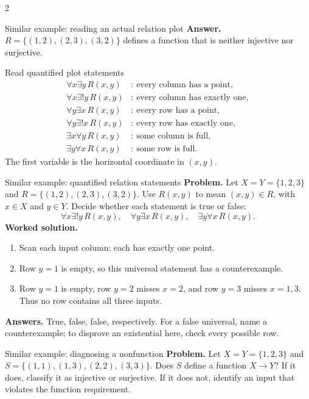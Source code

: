 \documentclass[10pt]{article}
\begin{document}
\begin{multicols}{2}
\begin{workedbox}{Similar example: reading an actual relation plot}
\textbf{Answer.} $R=\{(1,2),(2,3),(3,2)\}$ defines a function that is neither
injective nor surjective.
\end{workedbox}


\begin{methodbox}{Read quantified plot statements}
\begin{align*}
\forall x\exists y\,R(x,y)&:\ \text{every column has a point},\\
\forall x\exists!y\,R(x,y)&:\ \text{every column has exactly one},\\
\forall y\exists x\,R(x,y)&:\ \text{every row has a point},\\
\forall y\exists!x\,R(x,y)&:\ \text{every row has exactly one},\\
\exists x\forall y\,R(x,y)&:\ \text{some column is full},\\
\exists y\forall x\,R(x,y)&:\ \text{some row is full}.
\end{align*}
The first variable is the horizontal coordinate in $(x,y)$.
\end{methodbox}

\begin{workedbox}{Similar example: quantified relation statements}
\textbf{Problem.} Let $X=Y=\{1,2,3\}$ and
$R=\{(1,2),(2,3),(3,2)\}$. Use $R(x,y)$ to mean $(x,y)\in R$, with
$x\in X$ and $y\in Y$. Decide whether each statement is true or false:
\[
\forall x\exists!y\,R(x,y),\quad
\forall y\exists x\,R(x,y),\quad
\exists y\forall x\,R(x,y).
\]
\textbf{Worked solution.}
\begin{enumerate}
\item Scan each input column: each has exactly one point.
\item Row $y=1$ is empty, so this universal statement has a counterexample.
\item Row $y=1$ is empty, row $y=2$ misses $x=2$, and row $y=3$ misses
$x=1,3$. Thus no row contains all three inputs.
\end{enumerate}
\textbf{Answers.} True, false, false, respectively. For a false universal,
name a counterexample; to disprove an existential here, check every possible row.
\end{workedbox}

\begin{workedbox}{Similar example: diagnosing a nonfunction}
\textbf{Problem.} Let $X=Y=\{1,2,3\}$ and
$S=\{(1,1),(1,3),(2,2),(3,3)\}$. Does $S$ define a function $X\to Y$?
If it does, classify it as injective or surjective. If it does not, identify
an input that violates the function requirement.


\end{workedbox}
\end{multicols}
\end{document}
